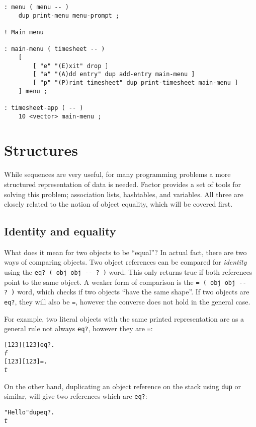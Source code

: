 \documentclass[english]{article}
\begin{document}
{\begin{verbatim}
: menu ( menu -- )
    dup print-menu menu-prompt ;

! Main menu

: main-menu ( timesheet -- )
    [
        [ "e" "(E)xit" drop ]
        [ "a" "(A)dd entry" dup add-entry main-menu ]
        [ "p" "(P)rint timesheet" dup print-timesheet main-menu ]
    ] menu ;

: timesheet-app ( -- )
    10 <vector> main-menu ;
\end{verbatim}

\section{Structures}

While sequences are very useful, for many programming problems a more structured representation of data is needed. Factor provides a set of tools for solving this problem; association lists, hashtables, and variables.
All three are closely related to the notion of object equality, which will be covered first.

\subsection{Identity and equality}

What does it mean for two objects to be ``equal''? In actual fact, there are two ways of comparing objects. Two object references can be compared for \emph{identity} using the \texttt{eq?~( obj obj -{}- ?~)} word. This only returns true if both references point to the same object. A weaker form of comparison is the \texttt{= ( obj obj -{}- ?~)} word, which checks if two objects ``have the same shape''.
If two objects are \texttt{eq?}, they will also be \texttt{=}, however the converse does not hold in the general case.

For example, two literal objects with the same printed representation are as a general rule not always \texttt{eq?}, however they are \texttt{=}:

\begin{alltt}
{[} 1 2 3 {]} {[} 1 2 3 {]} eq? .
\emph{f}
{[} 1 2 3 {]} {[} 1 2 3 {]} = .
\emph{t}
\end{alltt}

On the other hand, duplicating an object reference on the stack using \texttt{dup} or similar, will give two references which are \texttt{eq?}:

\begin{alltt}
"Hello" dup eq? .
\emph{t}
\end{alltt}

}
\end{document}
